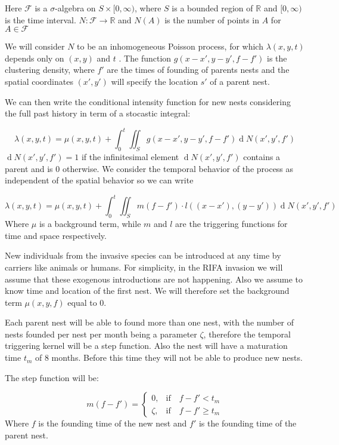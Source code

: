 \documentclass[11pt,a4paper]{article}
\renewcommand{\d}[1]{\ensuremath{\operatorname{d}\!{#1}}}
\begin{document}
Here $\mathcal{F}$ is a $\sigma$-algebra on $S \times [0, \infty )$, where $S$ is a bounded region of $\mathbb{R}$ and $[0, \infty)$ is the time interval. $N: \mathcal{F} \to \mathbb{R}$ and $N(A)$ is the number of points in $A$ for $A \in \mathcal{F}$

We will consider $N$ to be an inhomogeneous Poisson process, for which $\lambda(x, y, t)$ depends only on $(x, y)$ and $t$ \cite{Shoenberg}. The function $g(x - x', y - y', f - f')$ is the clustering density, where $f'$ are the times of founding of parents nests and the spatial coordinates $(x', y')$ will specify the location $s'$ of a parent nest.


We can then write the conditional intensity function for new nests considering the full past history in term of a stocastic integral:

\[
\lambda(x, y, t) = \mu(x, y, t) + \int_{0}^{t} \iint_{S} g(x - x', y - y', f - f') \d N(x', y', f')
\]
$\d N(x', y', f') = 1$ if the infinitesimal element $\d N(x', y', f')$ contains a parent and is 0 otherwise. We consider the temporal behavior of the process as independent of the spatial behavior so we can write

\[
\lambda(x, y, t) = \mu(x, y, t) + \int_{0}^{t} \iint_{S} m(f-f') \cdot l((x - x'), (y - y')) \d N(x', y', f')
\]
Where $\mu$ is a background term, while $m$ and $l$ are the triggering functions for time and space respectively. 

New individuals from the invasive species can be introduced at any time by carriers like animals or humans. For simplicity, in the RIFA invasion we will assume that these exogenous introductions are not happening. Also we assume to know time and location of the first nest.  We will therefore set the background term $\mu(x, y, f) $ equal to 0.

Each parent nest will be able to found more than one nest, with the number of nests founded per nest per month being a parameter $\zeta$, therefore the temporal triggering kernel will be a step function. Also the nest will have a maturation time $t_m$ of 8 months. Before this time they will not be able to produce new nests. 

The step function will be:


\[
m (f - f') =
\begin{cases}
0, & \mbox{if} \quad f - f' < t_{m} \\
\zeta, & \mbox{if} \quad f - f' \geq t_{m}
\end{cases}
\]
Where $f$ is the founding time of the new nest and $f'$ is the founding time of the parent nest.
\end{document}
